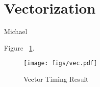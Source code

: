 \section{Vectorization}
Michael

Figure ~\ref{fig:vector_timing_result}.

\begin{figure}[h]
    \centering
    \texttt{[image: figs/vec.pdf]}
    \caption{Vector Timing Result}
    \label{fig:vector_timing_result}
\end{figure}